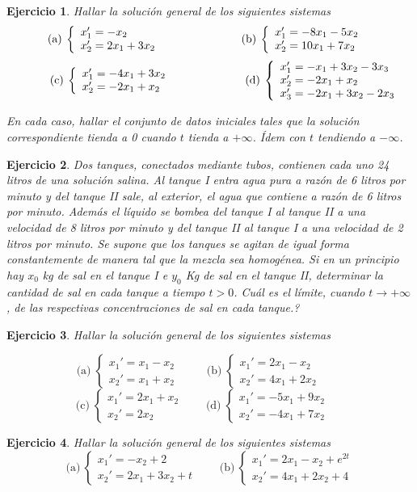 \documentclass[11pt]{article}
\newtheorem{ej}{Ejercicio}%
\newcommand{\ba}{\begin{array}}
\newcommand{\ea}{\end{array}}
\newcommand{\ii}{\'{\i}}
\newcommand{\bej}[1]{\begin{ej}\rm{#1}}
\newcommand{\eej}{\end{ej}\vspace{-0.2cm}}
\begin{document}
\bej Hallar la soluci\'on general de los siguientes sistemas
$$
\hskip-.2cm\text{(a)}\: \left\{\ba{l} x_1'=-x_2 \\x_2'=2x_1+3x_2 \ea \right.\qquad\qquad\qquad
\hskip.3cm\text{(b)}\: \left\{\ba{l} x_1'=-8x_1-5x_2\\x_2'=10x_1+7x_2\ea\right.
$$
$$
\hskip1cm\text{(c)}\: \left\{\ba{l}  x_1'=-4x_1+3x_2 \\x_2'=-2x_1+x_2\ea\right.\qquad\hskip1.5cm
\text{(d)}\:\left\{\ba{l} x_1'=-x_1+3x_2-3x_3\\   x_2'=-2x_1+x_2\\ x_3'=-2x_1+3x_2-2x_3
\ea\right.
$$

En cada caso, hallar el conjunto de datos iniciales tales que la
soluci\'on correspondiente tienda a 0 cuando $t$ tienda a
$+\infty$. Ídem con $t$ tendiendo a $-\infty$.

\eej

\bej Dos tanques, conectados mediante tubos, contienen cada uno 24 litros de una soluci\'on salina. Al tanque I entra agua pura a raz\'on de 6 litros por minuto y del tanque II sale, al exterior, el agua que contiene a raz\'on de 6 litros por minuto. Adem\'as el l\'iquido se bombea del tanque I al tanque II a
una velocidad de 8 litros por minuto y del tanque II al tanque I a una
velocidad de 2 litros por minuto. Se supone que los tanques se agitan de igual forma constantemente de manera tal que la mezcla sea homog\'enea. Si en un principio hay $x_0$ kg de sal en el tanque I e $y_0$ Kg de sal en el tanque II, determinar la cantidad de sal en cada tanque a tiempo $t>0$. Cu\'al es el l\'imite, cuando $t\to +\infty$, de las respectivas concentraciones de sal en cada tanque.?
\eej


\bej Hallar la soluci\'on general de los siguientes sistemas

$$\text{(a)}\; \left\{\ba{l}x_1'=x_1-x_2\\ x_2'=x_1+x_2  \ea \right. \qquad
\ \ \text{(b)}\; \left\{\ba{l}x_1'=2x_1-x_2\\ x_2'=4x_1+2x_2  \ea \right. \qquad
$$
$$\ \ \ \text{(c)}\; \left\{\ba{l}x_1'=2x_1+x_2   \\ x_2'=2x_2    \ea \right. \qquad
\text{(d)}\; \left\{\ba{l}x_1'=-5x_1+9x_2\\ x_2'=-4x_1+7x_2  \ea \right. \qquad
$$

\eej

\bej Hallar la soluci\'on general de los siguientes sistemas
$$
\text{(a)}\: \left\{\ba{l}x_1'=-x_2+2\\ x_2'=2x_1+3x_2+t \ea\right.\qquad
\text{(b)} \:\left\{\ba{l} x_1'=2x_1-x_2+e^{2t}\\ x_2'=4x_1+2x_2+4 \ea\right.
$$
\eej
\end{document}
